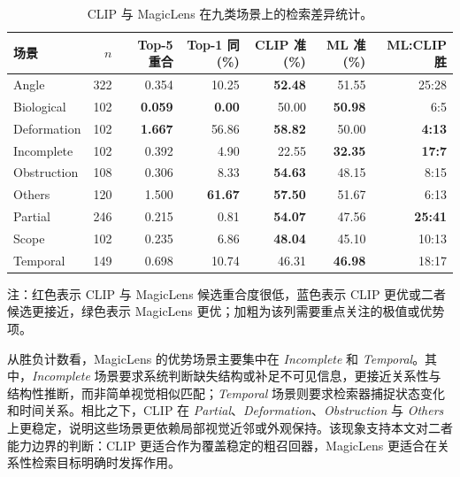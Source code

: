 \begin{table}[!htb]
\centering
\scriptsize
\caption{CLIP 与 MagicLens 在九类场景上的检索差异统计。}
\label{tab:scenario_retrieval_diff}
\begin{tabular}{lrrrrrr}
\toprule
\rowcolor{black!8}
\textbf{场景} & \textbf{$n$} & \textbf{Top-5 重合} & \textbf{Top-1 同(\%)} & \textbf{CLIP 准(\%)} & \textbf{ML 准(\%)} & \textbf{ML:CLIP 胜} \\
\midrule
Angle        & 322 & \cellcolor{red!10}0.354 & 10.25 & \cellcolor{blue!12}\textbf{52.48} & 51.55 & \cellcolor{blue!12}25:28 \\
Biological   & 102 & \cellcolor{red!20}\textbf{0.059} & \cellcolor{red!12}\textbf{0.00} & 50.00 & \cellcolor{green!15}\textbf{50.98} & \cellcolor{green!15}6:5  \\
Deformation  & 102 & \cellcolor{blue!15}\textbf{1.667} & \cellcolor{blue!18}56.86 & \cellcolor{blue!18}\textbf{58.82} & 50.00 & \cellcolor{blue!18}\textbf{4:13} \\
Incomplete   & 102 & \cellcolor{red!10}0.392 & 4.90 & 22.55 & \cellcolor{green!22}\textbf{32.35} & \cellcolor{green!22}\textbf{17:7} \\
Obstruction  & 108 & \cellcolor{red!10}0.306 & 8.33 & \cellcolor{blue!15}\textbf{54.63} & 48.15 & \cellcolor{blue!15}8:15 \\
Others       & 120 & \cellcolor{blue!12}1.500 & \cellcolor{blue!20}\textbf{61.67} & \cellcolor{blue!16}\textbf{57.50} & 51.67 & \cellcolor{blue!16}6:13 \\
Partial      & 246 & \cellcolor{red!15}0.215 & \cellcolor{red!10}0.81 & \cellcolor{blue!18}\textbf{54.07} & 47.56 & \cellcolor{blue!18}\textbf{25:41} \\
Scope        & 102 & \cellcolor{red!15}0.235 & 6.86 & \cellcolor{blue!10}\textbf{48.04} & 45.10 & \cellcolor{blue!10}10:13 \\
Temporal     & 149 & 0.698 & 10.74 & 46.31 & \cellcolor{green!12}\textbf{46.98} & \cellcolor{green!12}18:17 \\
\bottomrule
\end{tabular}
\vspace{0.25em}

\footnotesize
注：红色表示 CLIP 与 MagicLens 候选重合度很低，蓝色表示 CLIP 更优或二者候选更接近，绿色表示 MagicLens 更优；加粗为该列需要重点关注的极值或优势项。
\end{table}

从胜负计数看，MagicLens 的优势场景主要集中在 \textit{Incomplete} 和 \textit{Temporal}。其中，\textit{Incomplete} 场景要求系统判断缺失结构或补足不可见信息，更接近关系性与结构性推断，而非简单视觉相似匹配；\textit{Temporal} 场景则要求检索器捕捉状态变化和时间关系。相比之下，CLIP 在 \textit{Partial}、\textit{Deformation}、\textit{Obstruction} 与 \textit{Others} 上更稳定，说明这些场景更依赖局部视觉近邻或外观保持。该现象支持本文对二者能力边界的判断：CLIP 更适合作为覆盖稳定的粗召回器，MagicLens 更适合在关系性检索目标明确时发挥作用。

